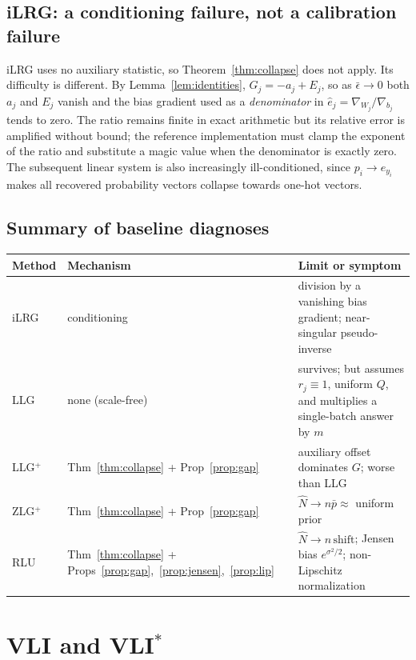 \documentclass[11pt]{article}
\theoremstyle{remark}
\begin{document}
\subsection{iLRG: a conditioning failure, not a calibration failure}

iLRG uses no auxiliary statistic, so Theorem~\ref{thm:collapse} does not
apply. Its difficulty is different. By Lemma~\ref{lem:identities},
$G_j = -a_j + E_j$, so as $\bar\epsilon \to 0$ both $a_j$ and $E_j$ vanish
and the bias gradient used as a \emph{denominator} in
$\hat e_j = \nabla_{W_j}/\nabla_{b_j}$ tends to zero. The ratio remains
finite in exact arithmetic but its relative error is amplified without
bound; the reference implementation must clamp the exponent of the ratio and
substitute a magic value when the denominator is exactly zero. The
subsequent linear system is also increasingly ill-conditioned, since
$p_i \to e_{y_i}$ makes all recovered probability vectors collapse towards
one-hot vectors.

\subsection{Summary of baseline diagnoses}

\begin{center}
\begin{tabular}{llp{6.3cm}}
\toprule
Method & Mechanism & Limit or symptom \\
\midrule
iLRG    & conditioning       & division by a vanishing bias gradient; near-singular pseudo-inverse \\
LLG     & none (scale-free)  & survives; but assumes $r_j \equiv 1$, uniform $Q$, and multiplies a single-batch answer by $m$ \\
LLG$^+$ & Thm~\ref{thm:collapse} + Prop~\ref{prop:gap} & auxiliary offset dominates $G$; worse than LLG \\
ZLG$^+$ & Thm~\ref{thm:collapse} + Prop~\ref{prop:gap} & $\widehat N \to n\bar p \approx$ uniform prior \\
RLU     & Thm~\ref{thm:collapse} + Props~\ref{prop:gap},~\ref{prop:jensen},~\ref{prop:lip} & $\widehat N \to n\,\mathrm{shift}$; Jensen bias $e^{\sigma^2/2}$; non-Lipschitz normalization \\
\bottomrule
\end{tabular}
\end{center}

\section{VLI and VLI$^*$}
\label{sec:vli}
\end{document}
